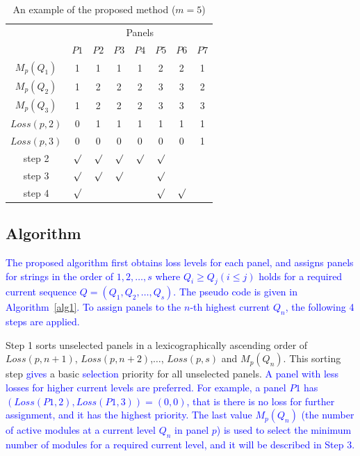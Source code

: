 \documentclass[conference]{pvsctran}
\newcommand{\michiko}{\textcolor{blue}}
\begin{document}
\begin{table}[t]
\caption{An example of the proposed method ($m = 5$)}
\begin{center}
\begin{tabular}{c|c|ccccc|c}\hline \hline
                               & \multicolumn{7}{c}{Panels}  \\
                               &  \multicolumn{1}{c}{$P1$}    & $P2$   & $P3$    & $P4$    & $P5$   & \multicolumn{1}{c}{$P6$}            & $P7$             \\ \hline
$M_{p}(Q_1)$        & 1     & 1     & 1     & 1     & 2    & 2    & 1              \\ \hline
$M_{p}(Q_2)$        & 1     & 2     & 2     & 2     & 3    & 3    & 2              \\ \hline
$M_{p}(Q_3)$        & 1     & 2     & 2     & 2     & 3    & 3    & 3              \\ \hline
$Loss(p,2)$           & 0     & 1     & 1     & 1     & 1    & 1    & 1    \\ \hline
$Loss(p,3)$           & 0     & 0     & 0     & 0     & 0    & 0    & 1    \\ \hline\hline
step 2        & $\surd$ & $\surd$ &$\surd$ &$\surd$ &$\surd$ & & \\ \hline
step 3      & $\surd$ & $\surd$ &$\surd$ & &$\surd$ & & \\ \hline
step 4       & $\surd$ &  & & &$\surd$ & $\surd$ & \\ \hline         
\end{tabular}
\end{center}
\label{tab:proposed-example}
\end{table}

\subsection{Algorithm}
\michiko{The proposed algorithm first obtains loss levels for each panel, and assigns panels for strings in the order of $1,2,\ldots ,s$ where $Q_{i} \geq Q_{j} (i \leq j)$ holds for a required current sequence $Q = (Q_{1},Q_{2},\ldots ,Q_{s})$. The pseudo code is given in Algorithm~\ref{alg1}.
To assign panels to the $n$-th highest current $Q_{n}$, the following 4 steps are applied.}

Step 1 sorts unselected panels in a lexicographically ascending order of $Loss(p,n+1)$, $Loss(p,n+2)$,$\ldots$, $Loss(p,s)$ and $M_{p}(Q_{n})$.
This sorting step \michiko{gives} a basic \michiko{selection} priority for all unselected panels. 
\michiko{A panel with less losses for higher current levels are preferred. For example, a panel $P1$ has $(Loss(P1,2), Loss(P1,3)) = (0,0)$, that is there is no loss for further assignment, and it has the highest priority. The last value $M_{p}(Q_{n})$ (the number of active modules at a current level $Q_{n}$ in panel $p$) is used to select the minimum number of modules for a required current level, and it will be described in Step 3.}
\end{document}
